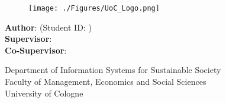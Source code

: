 \makeatletter
\begin{titlepage}
    \begin{center}
        \vspace*{1cm}

        \Large
        \textbf{\@title}

        \vspace{1.5cm}

        \thesistype{}

        \vspace{1cm}

        \begin{figure}[htbp]
             \centering
             \texttt{[image: ./Figures/UoC\_Logo.png]}
        \end{figure}

        \vspace{1cm}

        \large
        \textbf{Author}: \thesisauthor{} (Student ID: \studentID{})\\
        \large
        \textbf{Supervisor}: \supervisor{}\\
        \large
        \textbf{Co-Supervisor}: \cosupervisor{}

        \vspace{1cm}
        \large
        Department of Information Systems for Sustainable Society\\
        Faculty of Management, Economics and Social Sciences\\
        University of Cologne\\

        \vspace{1cm}
        \@date

    \end{center}
\end{titlepage}
\makeatother